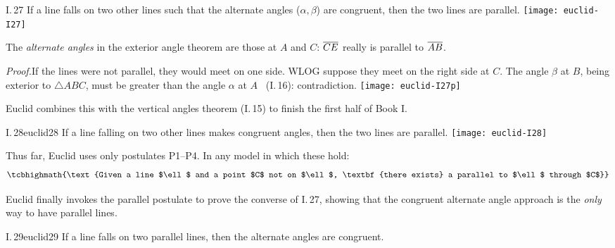 \begin{thm}[lower separated=false, sidebyside, sidebyside align=top seam, sidebyside gap=0pt, righthand width=0.32\linewidth]{I.\,27}{}
	If a line falls on two other lines such that the alternate angles ($\alpha,\beta$) are congruent, then the two lines are parallel.
	\tcblower
	\flushright\texttt{[image: euclid-I27]}
\end{thm}

The \emph{alternate angles} in the exterior angle theorem are those at $A$ and $C$: $\overline{CE}$ really is parallel to $\overline{AB}$.

\begin{tcolorbox}[proofstyle,lower separated=false, sidebyside, sidebyside align=top seam, sidebyside gap=0pt, righthand width=0.37\linewidth]
	\emph{Proof.}\lstsp If the lines were not parallel, they would meet on one side. WLOG suppose they meet on the right side at $C$.\smallbreak
	The angle $\beta$ at $B$, being exterior to $\triangle ABC$, must be greater than the angle $\alpha$ at $A$ \ (I.\,16): contradiction.
	\tcblower
	\flushright
	\texttt{[image: euclid-I27p]}\\[-12pt]\hfill\qedsymbol
\end{tcolorbox}

Euclid combines this with the vertical angles theorem (I.\,15) to finish the first half of Book I.

\begin{cor}[lower separated=false, sidebyside, sidebyside align=top seam, sidebyside gap=0pt, righthand width=0.32\linewidth]{I.\,28}{euclid28}
	If a line falling on two other lines makes congruent angles, then the two lines are parallel.
	\tcblower
	\flushright\texttt{[image: euclid-I28]}
\end{cor}


Thus far, Euclid uses only postulates P1--P4. In any model in which these hold:
\[
	\tcbhighmath{\text{Given a line $\ell$ and a point $C$ not on $\ell$, \textbf{there exists} a parallel to $\ell$ through $C$}}
\]
\goodbreak




Euclid finally invokes the parallel postulate to prove the converse of I.\,27, showing that the congruent alternate angle approach is the \emph{only} way to have parallel lines.

\begin{thm}{I.\,29}{euclid29}
	If a line falls on two parallel lines, then the alternate angles are congruent.
\end{thm}

